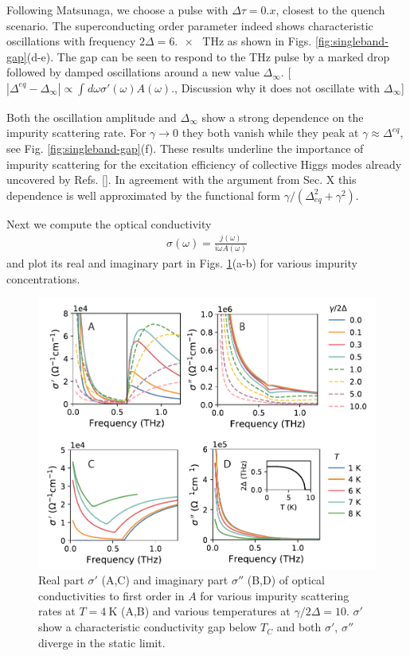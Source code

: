 \documentclass[aps,prb,reprint,noeprint,superscriptaddress]{revtex4-1}
\begin{document}
Following Matsunaga, we choose a pulse with $\Delta \tau = 0.x$, closest to the
quench scenario. The superconducting order parameter indeed shows characteristic
oscillations with frequency $2\Delta=\SI{6.x}{\tera\hertz}$ as shown in Figs.
\ref{fig:singleband-gap}(d-e). The gap can be seen to respond to the THz pulse
by a marked drop followed by damped oscillations around a new value
$\Delta_{\infty}$. [$\left|\Delta^{eq}-\Delta_{\infty}\right| \propto
  \int_{}^{}d\omega \sigma'(\omega) A(\omega).$, 
Discussion why it does not oscillate with $\Delta_{\infty}$] 

Both the oscillation amplitude and $\Delta_{\infty}$ show a
strong dependence on the impurity scattering rate. For $\gamma\rightarrow 0$
they both vanish while they peak at $\gamma\approx
\Delta^{eq}$, see Fig. \ref{fig:singleband-gap}(f). These results underline the
importance of impurity scattering for the excitation efficiency of collective
Higgs modes already uncovered by Refs. [].
In agreement with the argument from Sec. X this dependence is well approximated by
the functional form $\gamma/(\Delta_{eq}^2+\gamma^2)$.


Next we compute the optical conductivity
\begin{eqnarray*}
\sigma(\omega)=\frac{j(\omega)}{i\omega A(\omega)}
\end{eqnarray*}
and plot its real and
imaginary part in Figs. \ref{fig:cond-lin}(a-b) for various impurity
concentrations. 



\begin{figure}[t]
	\centering
	\includegraphics[width=\columnwidth]{figures/fig2.pdf}
	\caption{Real part $\sigma'$ (A,C) and imaginary part $\sigma''$ (B,D)
		of optical conductivities to first order in $A$ 
	for various impurity scattering rates at $T=\SI{4}{\kelvin}$ (A,B) and
various temperatures at $\gamma/2\Delta=10$. $\sigma'$ show a characteristic
conductivity gap below $T_C$ and both $\sigma'$, $\sigma''$ diverge in the
static limit.}
\label{fig:cond-lin}
\end{figure}
\end{document}
